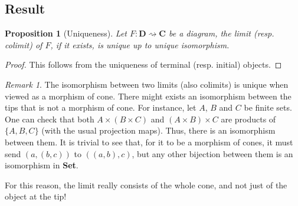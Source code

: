 \documentclass{article}
\newtheorem{prop}[thm]{Proposition}
\theoremstyle{definition}
\theoremstyle{remark}
\newtheorem{rem}[thm]{Remark}
\begin{document}
\subsection{Result}
\begin{prop}[Uniqueness]
    Let $F: \mathbf{D} \rightsquigarrow \mathbf{C}$ be a diagram, the limit (resp. colimit) of $F$, if it exists, is unique up to unique isomorphism.
\end{prop}
\begin{proof}
    This follows from the uniqueness of terminal (resp. initial) objects.
\end{proof}
\begin{rem}
    The isomorphism between two limits (also colimits) is unique when viewed as a morphism of cone. There might exists an isomorphism between the tips that is not a morphism of cone. For instance, let $A$, $B$ and $C$ be finite sets. One can check that both $A \times (B \times C)$ and $(A \times B) \times C$ are products of $\{A, B, C\}$ (with the usual projection maps). Thus, there is an isomorphism between them. It is trivial to see that, for it to be a morphism of cones, it must send $(a, (b,c))$ to $((a,b), c)$, but any other bijection between them is an isomorphism in \textbf{Set}.
    
    For this reason, the limit really consists of the whole cone, and not just of the object at the tip!
\end{rem}




\end{document}
